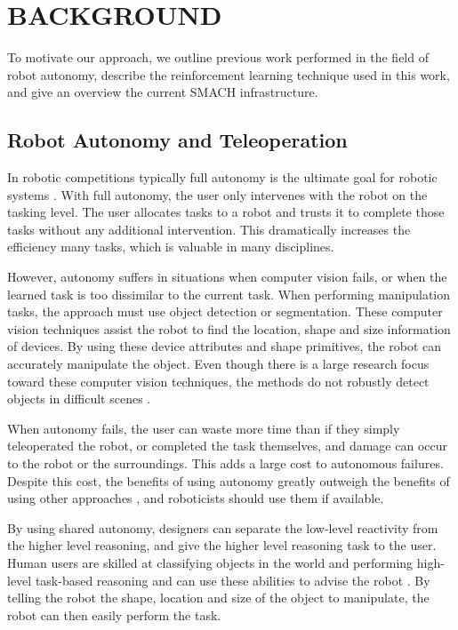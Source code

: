 \documentclass[letterpaper, 10 pt, conference]{ieeeconf}  %
\begin{document}
\section{BACKGROUND}

To motivate our approach, we outline previous work performed in the field of robot autonomy, describe the reinforcement learning technique used in this work, and give an overview the current SMACH infrastructure.

\subsection{Robot Autonomy and Teleoperation}

In robotic competitions typically full autonomy is the ultimate goal for robotic systems \cite{darpa}. With full autonomy, the user only intervenes with the robot on the tasking level. The user allocates tasks to a robot and trusts it to complete those tasks without any additional intervention. This dramatically increases the efficiency many tasks, which is valuable in many disciplines. 

However, autonomy suffers in situations when computer vision fails, or when the learned task is too dissimilar to the current task. When performing manipulation tasks, the approach must use object detection or segmentation. These computer vision techniques assist the robot to find the location, shape and size information of devices. By using these device attributes and shape primitives, the robot can accurately manipulate the object. Even though there is a large research focus toward these computer vision techniques, the methods do not robustly detect objects in difficult scenes \cite{5980259}.  

When autonomy fails, the user can waste more time than if they simply teleoperated the robot, or completed the task themselves, and damage can occur to the robot or the surroundings. This adds a large cost to autonomous failures. Despite this cost, the benefits of using autonomy greatly outweigh the benefits of using other approaches \cite{6343870}, and roboticists should use them if available.

By using shared autonomy, designers can separate the low-level reactivity from the higher level reasoning, and give the higher level reasoning task to the user. Human users are skilled at classifying objects in the world and performing high-level task-based reasoning and can use these abilities to advise the robot \cite{goodfellow_help_2010}. By telling the robot the shape, location and size of the object to manipulate, the robot can then easily perform the task.
\end{document}
